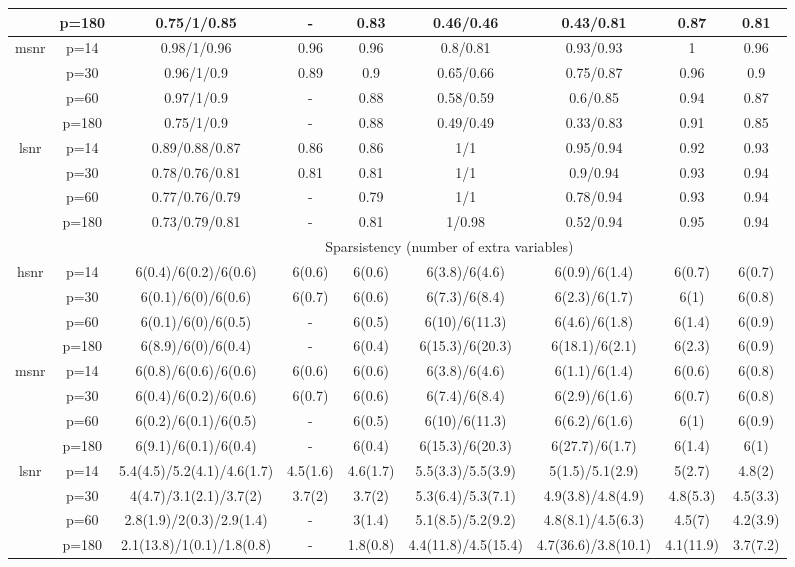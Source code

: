 \begin{table}[ht]
{\begin{tabular}{|c|c|ccccccc|}
   & p=180 & 0.75/1/0.85 & - & 0.83 & 0.46/0.46 & 0.43/0.81 & 0.87 & 0.81 \\ 
  \midrule\multirow{4}[2]{*}{msnr} & p=14 & 0.98/1/0.96 & 0.96 & 0.96 & 0.8/0.81 & 0.93/0.93 & 1 & 0.96 \\ 
   & p=30 & 0.96/1/0.9 & 0.89 & 0.9 & 0.65/0.66 & 0.75/0.87 & 0.96 & 0.9 \\ 
   & p=60 & 0.97/1/0.9 & - & 0.88 & 0.58/0.59 & 0.6/0.85 & 0.94 & 0.87 \\ 
   & p=180 & 0.75/1/0.9 & - & 0.88 & 0.49/0.49 & 0.33/0.83 & 0.91 & 0.85 \\ 
  \midrule\multirow{4}[2]{*}{lsnr} & p=14 & 0.89/0.88/0.87 & 0.86 & 0.86 & 1/1 & 0.95/0.94 & 0.92 & 0.93 \\ 
   & p=30 & 0.78/0.76/0.81 & 0.81 & 0.81 & 1/1 & 0.9/0.94 & 0.93 & 0.94 \\ 
   & p=60 & 0.77/0.76/0.79 & - & 0.79 & 1/1 & 0.78/0.94 & 0.93 & 0.94 \\ 
   & p=180 & 0.73/0.79/0.81 & - & 0.81 & 1/0.98 & 0.52/0.94 & 0.95 & 0.94 \\ 
   \midrule 
 \multicolumn{1}{|c}{} &       & \multicolumn{7}{c|}{Sparsistency (number of extra variables)} \\
\midrule\multirow{4}[2]{*}{hsnr} & p=14 & 6(0.4)/6(0.2)/6(0.6) & 6(0.6) & 6(0.6) & 6(3.8)/6(4.6) & 6(0.9)/6(1.4) & 6(0.7) & 6(0.7) \\ 
   & p=30 & 6(0.1)/6(0)/6(0.6) & 6(0.7) & 6(0.6) & 6(7.3)/6(8.4) & 6(2.3)/6(1.7) & 6(1) & 6(0.8) \\ 
   & p=60 & 6(0.1)/6(0)/6(0.5) & - & 6(0.5) & 6(10)/6(11.3) & 6(4.6)/6(1.8) & 6(1.4) & 6(0.9) \\ 
   & p=180 & 6(8.9)/6(0)/6(0.4) & - & 6(0.4) & 6(15.3)/6(20.3) & 6(18.1)/6(2.1) & 6(2.3) & 6(0.9) \\ 
  \midrule\multirow{4}[2]{*}{msnr} & p=14 & 6(0.8)/6(0.6)/6(0.6) & 6(0.6) & 6(0.6) & 6(3.8)/6(4.6) & 6(1.1)/6(1.4) & 6(0.6) & 6(0.8) \\ 
   & p=30 & 6(0.4)/6(0.2)/6(0.6) & 6(0.7) & 6(0.6) & 6(7.4)/6(8.4) & 6(2.9)/6(1.6) & 6(0.7) & 6(0.8) \\ 
   & p=60 & 6(0.2)/6(0.1)/6(0.5) & - & 6(0.5) & 6(10)/6(11.3) & 6(6.2)/6(1.6) & 6(1) & 6(0.9) \\ 
   & p=180 & 6(9.1)/6(0.1)/6(0.4) & - & 6(0.4) & 6(15.3)/6(20.3) & 6(27.7)/6(1.7) & 6(1.4) & 6(1) \\ 
  \midrule\multirow{4}[2]{*}{lsnr} & p=14 & 5.4(4.5)/5.2(4.1)/4.6(1.7) & 4.5(1.6) & 4.6(1.7) & 5.5(3.3)/5.5(3.9) & 5(1.5)/5.1(2.9) & 5(2.7) & 4.8(2) \\ 
   & p=30 & 4(4.7)/3.1(2.1)/3.7(2) & 3.7(2) & 3.7(2) & 5.3(6.4)/5.3(7.1) & 4.9(3.8)/4.8(4.9) & 4.8(5.3) & 4.5(3.3) \\ 
   & p=60 & 2.8(1.9)/2(0.3)/2.9(1.4) & - & 3(1.4) & 5.1(8.5)/5.2(9.2) & 4.8(8.1)/4.5(6.3) & 4.5(7) & 4.2(3.9) \\ 
   & p=180 & 2.1(13.8)/1(0.1)/1.8(0.8) & - & 1.8(0.8) & 4.4(11.8)/4.5(15.4) & 4.7(36.6)/3.8(10.1) & 4.1(11.9) & 3.7(7.2) \\ 
   \bottomrule 
\end{tabular}
}
\end{table}
